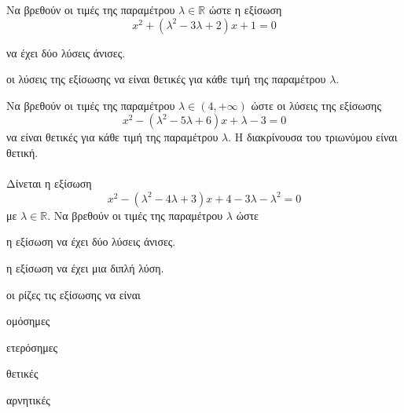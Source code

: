 \documentclass[11pt,a4paper,modern]{FFExercises}
\begin{document}
\askhsh Να βρεθούν οι τιμές της παραμέτρου $ \lambda\in\mathbb{R} $ ώστε η εξίσωση 
\[ x^2+\left( \lambda^2-3\lambda+2\right) x+1=0 \]
\begin{alist}
\item να έχει δύο λύσεις άνισες.
\item οι λύσεις της εξίσωσης να είναι θετικές για κάθε τιμή της παραμέτρου $ \lambda $.
\end{alist}
\askhsh Να βρεθούν οι τιμές της παραμέτρου $ \lambda\in(4,+\infty) $ ώστε οι λύσεις της εξίσωσης  \[ x^2-\left( \lambda^2-5\lambda+6\right) x+\lambda-3=0 \] να είναι θετικές για κάθε τιμή της παραμέτρου $ \lambda $. Η διακρίνουσα του τριωνύμου είναι θετική.\\\\
\askhsh Δίνεται η εξίσωση \[ x^2-\left(\lambda^2-4\lambda+3\right)x+4-3\lambda-\lambda^2=0 \] με $\lambda\in\mathbb{R}$. Να βρεθούν οι τιμές της παραμέτρου $ \lambda $ ώστε
\begin{alist}
\item η εξίσωση να έχει δύο λύσεις άνισες.
\item η εξίσωση να έχει μια διπλή λύση.
\item οι ρίζες τις εξίσωσης να είναι
\begin{rlist}
\item ομόσημες
\item ετερόσημες
\item θετικές
\item αρνητικές
\end{rlist}
\end{alist}
\end{document}
